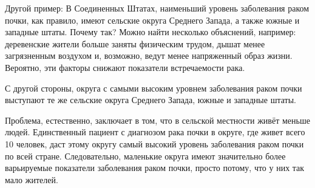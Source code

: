 Другой пример: В Соединенных Штатах, наименьший уровень заболевания раком почки, как правило, имеют сельские округа Среднего Запада, а также южные и западные штаты. Почему так? Можно найти несколько объяснений, например: деревенские жители больше заняты физическим трудом, дышат менее загрязненным воздухом и, возможно, ведут менее напряженный образ жизни. Вероятно, эти факторы снижают показатели встречаемости рака. 

С другой стороны, округа с самыми высоким уровнем заболевания раком почки выступают те же сельские округа Среднего Запада, южные и западные штаты.

Проблема, естественно, заключает в том, что в сельской местности живёт меньше людей. Единственный пациент с диагнозом рака почки в округе, где живет всего 10 человек, даст этому округу самый высокий уровень заболевания раком почки по всей стране. Следовательно, маленькие округа имеют значительно более варьируемые показатели заболевания раком почки, просто потому, что у них так мало жителей. \cite{gelman_all_1999}

